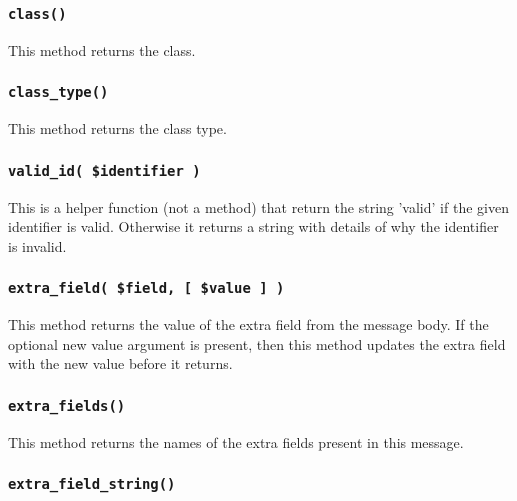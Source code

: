 \documentclass[12pt,a4paper]{article}
\begin{document}
\subsubsection*{\texttt{class()}\label{xPL::Message_class_}}


This method returns the class.

\subsubsection*{\texttt{class\_type()}\label{xPL::Message_class_type_}}


This method returns the class type.

\subsubsection*{\texttt{valid\_id( \$identifier )}\label{xPL::Message_valid_id_identifier_}}


This is a helper function (not a method) that return the string
'valid' if the given identifier is valid.  Otherwise it returns a
string with details of why the identifier is invalid.

\subsubsection*{\texttt{extra\_field( \$field, [ \$value ] )}\label{xPL::Message_extra_field_field_value_}}


This method returns the value of the extra field from the message
body.  If the optional new value argument is present, then this method
updates the extra field with the new value before it returns.

\subsubsection*{\texttt{extra\_fields()}\label{xPL::Message_extra_fields_}}


This method returns the names of the extra fields present in this
message.

\subsubsection*{\texttt{extra\_field\_string()}\label{xPL::Message_extra_field_string_}}
\end{document}
